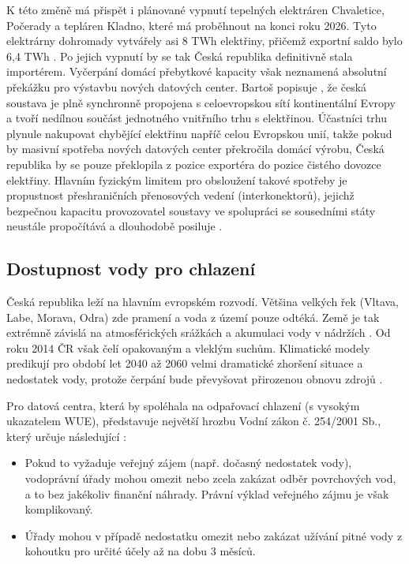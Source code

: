 K této změně má přispět i plánované vypnutí tepelných elektráren Chvaletice, Počerady a tepláren Kladno, které má proběhnout na konci roku 2026. Tyto elektrárny dohromady vytvářely asi 8 TWh elektřiny, přičemž exportní saldo bylo 6,4 TWh \cite{chlubna}. Po jejich vypnutí by se tak Česká republika definitivně stala importérem. Vyčerpání domácí přebytkové kapacity však neznamená absolutní překážku pro výstavbu nových datových center. Bartoš \cite{bartos_energetika_2025} popisuje , že česká soustava je plně synchronně propojena s celoevropskou sítí kontinentální Evropy a tvoří nedílnou součást jednotného vnitřního trhu s elektřinou. Účastníci trhu plynule nakupovat chybějící elektřinu napříč celou Evropskou unií, takže pokud by masivní spotřeba nových datových center překročila domácí výrobu, Česká republika by se pouze překlopila z pozice exportéra do pozice čistého dovozce elektřiny. Hlavním fyzickým limitem pro obsloužení takové spotřeby je propustnost přeshraničních přenosových vedení (interkonektorů), jejichž bezpečnou kapacitu provozovatel soustavy ve spolupráci se sousedními státy neustále propočítává a dlouhodobě posiluje \cite{bartos_energetika_2025}.


\subsection{Dostupnost vody pro chlazení}
\label{subsec:cz_voda_dostupnost}

Česká republika leží na hlavním evropském rozvodí. Většina velkých řek (Vltava, Labe, Morava, Odra) zde pramení a voda z území pouze odtéká. Země je tak extrémně závislá na atmosférických srážkách a akumulaci vody v nádržích \cite{hornicek_water_2026}. Od roku 2014 ČR však čelí opakovaným a vleklým suchům. Klimatické modely predikují pro období let 2040 až 2060 velmi dramatické zhoršení situace a nedostatek vody, protože čerpání bude převyšovat přirozenou obnovu zdrojů \cite{mullerova_water_2024}.

Pro datová centra, která by spoléhala na odpařovací chlazení (s vysokým ukazatelem WUE), představuje největší hrozbu Vodní zákon č. 254/2001 Sb., který určuje následující \cite{mullerova_water_2024}: 

\begin{itemize}

\item Pokud to vyžaduje veřejný zájem (např. dočasný nedostatek vody), vodoprávní úřady mohou omezit nebo zcela zakázat odběr povrchových vod, a to bez jakékoliv finanční náhrady. Právní výklad veřejného zájmu je však komplikovaný.

\item Úřady mohou v případě nedostatku omezit nebo zakázat užívání pitné vody z kohoutku pro určité účely až na dobu 3 měsíců.

\end{itemize}

